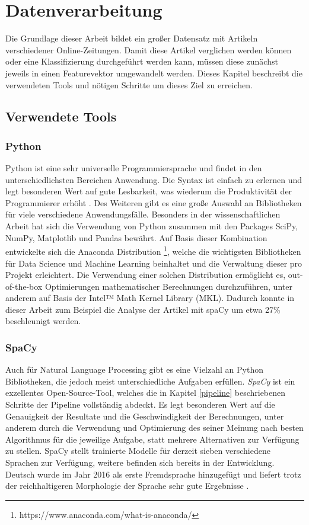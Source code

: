 
\chapter{Datenverarbeitung}
Die Grundlage dieser Arbeit bildet ein großer Datensatz mit Artikeln verschiedener Online-Zeitungen. Damit diese Artikel verglichen werden können oder eine Klassifizierung durchgeführt werden kann, müssen diese zunächst jeweils in einen Featurevektor umgewandelt werden. Dieses Kapitel beschreibt die verwendeten Tools und nötigen Schritte um dieses Ziel zu erreichen.

\section{Verwendete Tools}

\subsection{Python}\label{python}
Python ist eine sehr universelle Programmiersprache und findet in den unterschiedlichsten Bereichen Anwendung. Die Syntax ist einfach zu erlernen und legt besonderen Wert auf gute Lesbarkeit, was wiederum die Produktivität der Programmierer erhöht \cite{pythonSummary}. Des Weiteren gibt es eine große Auswahl an Bibliotheken für viele verschiedene Anwendungsfälle. Besonders in der wissenschaftlichen Arbeit hat sich die Verwendung von Python zusammen mit den Packages SciPy, NumPy, Matplotlib und Pandas bewährt. Auf Basis dieser Kombination entwickelte sich die Anaconda Distribution \footnote{https://www.anaconda.com/what-is-anaconda/}, welche die wichtigsten Bibliotheken für Data Science und Machine Learning beinhaltet und die Verwaltung dieser pro Projekt erleichtert. Die Verwendung einer solchen Distribution ermöglicht es, out-of-the-box Optimierungen mathematischer Berechnungen durchzuführen, unter anderem auf Basis der Intel™ Math Kernel Library (MKL). Dadurch konnte in dieser Arbeit zum Beispiel die Analyse der Artikel mit spaCy um etwa 27\% beschleunigt werden.

\subsection{SpaCy}
Auch für Natural Language Processing gibt es eine Vielzahl an Python Bibliotheken, die jedoch meist unterschiedliche Aufgaben erfüllen. \emph{SpaCy} ist ein exzellentes Open-Source-Tool, welches die in Kapitel \ref{pipeline} beschriebenen Schritte der Pipeline vollständig abdeckt. Es legt besonderen Wert auf die Genauigkeit der Resultate und die Geschwindigkeit der Berechnungen, unter anderem durch die Verwendung und Optimierung des seiner Meinung nach besten Algorithmus für die jeweilige Aufgabe, statt mehrere Alternativen zur Verfügung zu stellen. SpaCy stellt trainierte Modelle für derzeit sieben verschiedene Sprachen zur Verfügung, weitere befinden sich bereits in der Entwicklung. Deutsch wurde im Jahr 2016 als erste Fremdsprache hinzugefügt und liefert trotz der reichhaltigeren Morphologie der Sprache sehr gute Ergebnisse \cite{spacyGerman}.

